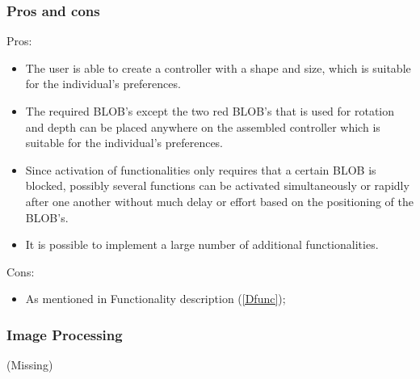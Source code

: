 \subsubsection*{Pros and cons}
Pros:
\begin{itemize}
\item The user is able to create a controller with a shape and size, which is suitable for the individual’s preferences.
\item The required BLOB’s except the two red BLOB’s that is used for rotation and depth can be placed anywhere on the assembled controller which is suitable for the individual’s preferences.
\item Since activation of functionalities only requires that a certain BLOB is blocked, possibly several functions can be activated simultaneously or rapidly after one another without much delay or effort based on the positioning of the BLOB’s.
\item It is possible to implement a large number of additional functionalities.
\end{itemize}
Cons:
\begin{itemize}
\item As mentioned in Functionality description (\ref{Dfunc}); 
\end{itemize}

\subsubsection*{Image Processing}
(Missing)